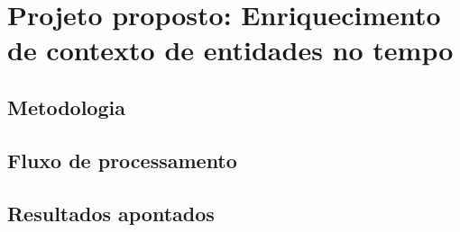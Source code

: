 \chapter{Projeto proposto: Enriquecimento de contexto de entidades no tempo}

\section{Metodologia}

\section{Fluxo de processamento}

\section{Resultados apontados}